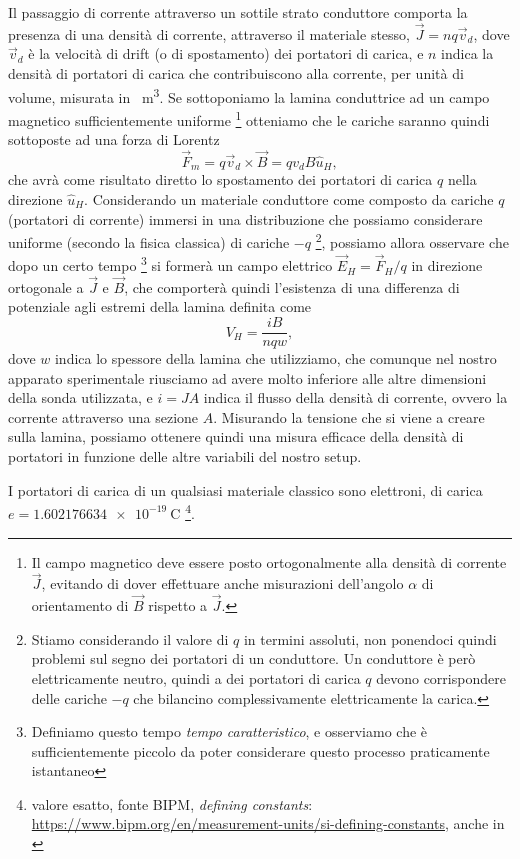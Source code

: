 \documentclass[
    prl,
    reprint, 
    superscriptaddress, 
    altaffilletter, 
    amsmath, 
    amssymb, 
    a4paper,
    varvw]{revtex4-2}
\begin{document}
Il passaggio di corrente attraverso un sottile strato conduttore comporta la presenza di una densità di corrente, attraverso il materiale stesso, $\vec{J}=nq\vec{v}_d$, dove $\vec{v}_d$ è la velocità di drift (o di spostamento) dei portatori di carica, e $n$ indica la densità di portatori di carica che contribuiscono alla corrente, per unità di volume, misurata in \si{\per\cubic\metre}. Se sottoponiamo la lamina conduttrice ad un campo magnetico sufficientemente uniforme \footnote{Il campo magnetico deve essere posto ortogonalmente alla densità di corrente $\vec{J}$, evitando di dover effettuare anche misurazioni dell'angolo $\alpha$ di orientamento di $\vec{B}$ rispetto a $\vec{J}$.} otteniamo che le cariche saranno quindi sottoposte ad una forza di Lorentz \begin{equation}
    \vec{F}_m = q\vec{v}_d \times \vec{B} = qv_dB\hat{u}_H,\label{eq:lorentz_F_m}
\end{equation} che avrà come risultato diretto lo spostamento dei portatori di carica $q$ nella direzione $\hat{u}_H$. Considerando un materiale conduttore come composto da cariche $q$ (portatori di corrente) immersi in una distribuzione che possiamo considerare uniforme (secondo la fisica classica) di cariche $-q$ \footnote{Stiamo considerando il valore di $q$ in termini assoluti, non ponendoci quindi problemi sul segno dei portatori di un conduttore. Un conduttore è però elettricamente neutro, quindi a dei portatori di carica $q$ devono corrispondere delle cariche $-q$ che bilancino complessivamente elettricamente la carica. }, possiamo allora osservare che dopo un certo tempo \footnote{Definiamo questo tempo \emph{tempo caratteristico}, e osserviamo che è sufficientemente piccolo da poter considerare questo processo praticamente istantaneo} si formerà un campo elettrico $\vec{E}_H = \vec{F}_H/q$ in direzione ortogonale a $\vec{J}$ e $\vec{B}$, che comporterà quindi l'esistenza di una differenza di potenziale agli estremi della lamina definita come \begin{equation}
    V_H = \frac{iB}{nqw},
\end{equation} dove $w$ indica lo spessore della lamina che utilizziamo, che comunque nel nostro apparato sperimentale riusciamo ad avere molto inferiore alle altre dimensioni della sonda utilizzata, e $i=JA$ indica il flusso della densità di corrente, ovvero la corrente attraverso una sezione $A$. Misurando la tensione che si viene a creare sulla lamina, possiamo ottenere quindi una misura efficace della densità di portatori in funzione delle altre variabili del nostro setup. 

I portatori di carica di un qualsiasi materiale classico sono elettroni, di carica $e=\SI{1.602176634e-19}{\coulomb}$ \footnote{valore esatto, fonte BIPM, \emph{defining constants}: \url{https://www.bipm.org/en/measurement-units/si-defining-constants}, anche in \cite{Newell_2018}}.

\appendix

\setcounter{table}{0}
\renewcommand{\thetable}{A-\Roman{table}}

%

\end{document}
